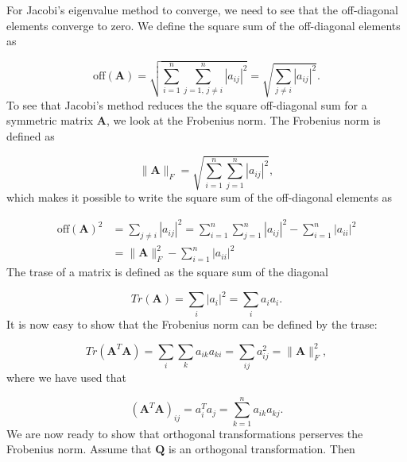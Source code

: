 \documentclass{emulateapj}
\begin{document}
        For Jacobi's eigenvalue method to converge, we need to see that the off-diagonal elements converge to zero. We define the square sum of the off-diagonal elements as
    
        \begin{equation*}
            \text{off}(\bm{A}) = \sqrt{\sum\limits_{i=1}^n \sum\limits_{j=1,\,j\neq i}^n |a_{ij}|^2} = \sqrt{\sum\limits_{j\neq i} |a_{ij}|^2}.
        \end{equation*}
        To see that Jacobi's method reduces the the square off-diagonal sum for a symmetric matrix \(\bm{A}\), we look at the Frobenius norm. The Frobenius norm is defined as
        
        \begin{equation}
            \parallel \bm{A} \parallel_F = \sqrt{\sum\limits_{i=1}^n \sum\limits_{j=1}^n |a_{ij}|^2},
        \end{equation}
        which makes it possible to write the square sum of the off-diagonal elements as
        
        \begin{align*}
            \text{off}(\bm{A})^{2} &= \sum\limits_{j\neq i} |a_{ij}|^2 = \sum\limits_{i=1}^n \sum\limits_{j=1}^n |a_{ij}|^2 - \sum\limits_{i=1}^{n}|a_{ii}|^{2}
            \\
            &= \parallel \bm{A} \parallel_{F}^{2} - \sum\limits_{i=1}^{n}|a_{ii}|^{2}  
        \end{align*}
        The trase of a matrix is defined as the square sum of the diagonal
        
        \begin{equation*}
            Tr(\bm{A})= \sum_{i}|a_{i}|^2 = \sum_{i}a_{i}a_{i}.
        \end{equation*}
        It is now easy to show that the Frobenius norm can be defined by the trase:

        \begin{equation*}
            Tr(\bm{A}^{T}\bm{A})= \sum_{i}\sum_{k}a_{ik}a_{ki}=\sum_{ij}a_{ij}^{2}=\parallel\bm{A}\parallel_{F}^{2},
        \end{equation*}
        where we have used that
        
        \begin{equation*}
            (\bm{A}^{T}\bm{A})_{ij} = a_{i}^{T}a_{j}=\sum_{k=1}^{n}a_{ik}a_{kj}.
        \end{equation*}
        We are now ready to show that orthogonal transformations perserves the Frobenius norm. Assume that \(\bm{Q}\) is an orthogonal transformation. Then
\end{document}
